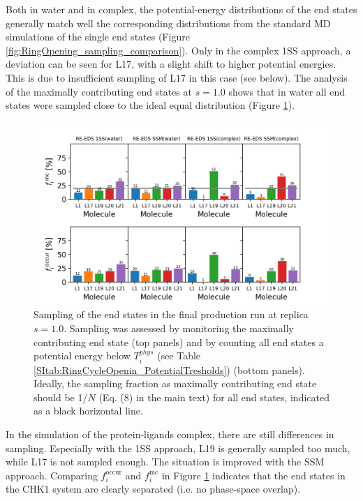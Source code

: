 Both in water and in complex, the potential-energy distributions of the end states generally match well the corresponding distributions from the standard MD simulations of the single end states (Figure \ref{fig:RingOpening_sampling_comparison}). Only in the complex 1SS approach, a deviation can be seen for L17, with a slight shift to higher potential energies. This is due to insufficient sampling of L17 in this case (see below). 
%
The analysis of the maximally contributing end states at $s=1.0$ shows that in water all end states were sampled close to the ideal equal distribution (Figure \ref{SIfig:CHK1_RingOpening_soptimization_final_Sampling_s1}). 
\begin{figure}[H]
\centering
\includegraphics[width=\textwidth]{fig/results/ringOpening/FE/Reeds_RingOpening_production_sampling_s1.png}
\caption{Sampling of the end states in the final production run at replica $s=1.0$. Sampling was assessed by monitoring the maximally contributing end state (top panels) and by counting all end states a potential energy below $T_{i}^{phys}$ (see Table \ref{SItab:RingCycleOpenin_PotentialTresholds}) (bottom panels). Ideally, the sampling fraction as maximally contributing end state should be 1/$N$ (Eq. (8) in the main text) for all end states, indicated as a black horizontal line.}
\label{SIfig:CHK1_RingOpening_soptimization_final_Sampling_s1}
\end{figure}


In the simulation of the protein-ligands complex, there are still differences in sampling. Especially with the 1SS approach, L19 is generally sampled too much, while L17 is not sampled enough. The situation is improved with the SSM approach.
Comparing $f_i^{\text{occur}}$ and $f_i^{\text{mc}}$ in Figure \ref{SIfig:CHK1_RingOpening_soptimization_final_Sampling_s1} indicates that the end states in the CHK1 system are clearly separated (i.e. no phase-space overlap).

